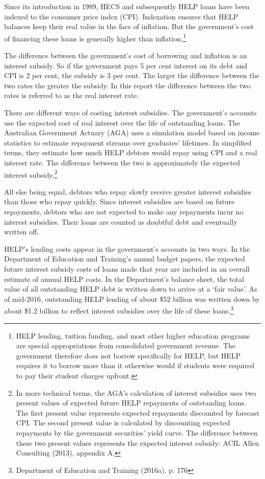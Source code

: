\documentclass[]{book}
\begin{document}
\protect\hypertarget{_Ref332899615}{}{\protect\hypertarget{_Ref332978906}{}{}}Since its introduction in 1989, HECS and subsequently HELP loans have been indexed to the consumer price index (CPI). Indexation ensures that HELP balances keep their real value in the face of inflation. But the government's cost of financing these loans is generally higher than inflation.\footnote{HELP lending, tuition funding, and most other higher education programs are special appropriations from consolidated government revenue. The government therefore does not borrow specifically for HELP, but HELP requires it to borrow more than it otherwise would if students were required to pay their student charges upfront.}

The difference between the government's cost of borrowing and inflation is an interest subsidy. So if the government pays 5 per cent interest on its debt and CPI is 2 per cent, the subsidy is 3 per cent. The larger the difference between the two rates the greater the subsidy. In this report the difference between the two rates is referred to as the real interest rate.

There are different ways of costing interest subsidies. The government's accounts use the expected cost of real interest over the life of outstanding loans. The Australian Government Actuary (AGA) uses a simulation model based on income statistics to estimate repayment streams over graduates' lifetimes. In simplified terms, they estimate how much HELP debtors would repay using CPI and a real interest rate. The difference between the two is approximately the expected interest subsidy.\footnote{In more technical terms, the AGA's calculation of interest subsidies uses two present values of expected future HELP repayments of outstanding loans. The first present value represents expected repayments discounted by forecast CPI. The second present value is calculated by discounting expected repayments by the government securities' yield curve. The difference between these two present values represents the expected interest subsidy: ACIL Allen Consulting (2013), appendix A.}

All else being equal, debtors who repay slowly receive greater interest subsidies than those who repay quickly. Since interest subsidies are based on future repayments, debtors who are not expected to make any repayments incur no interest subsidies. Their loans are counted as doubtful debt and eventually written off.

HELP's lending costs appear in the government's accounts in two ways. In the Department of Education and Training's annual budget papers, the expected future interest subsidy costs of loans made that year are included in an overall estimate of annual HELP costs. In the Department's balance sheet, the total value of all outstanding HELP debt is written down to arrive at a `fair value'. As of mid-2016, outstanding HELP lending of about \$52 billion was written down by about \$1.2 billion to reflect interest subsidies over the life of these loans.\footnote{Department of Education and Training (2016a), p. 176}
\end{document}
